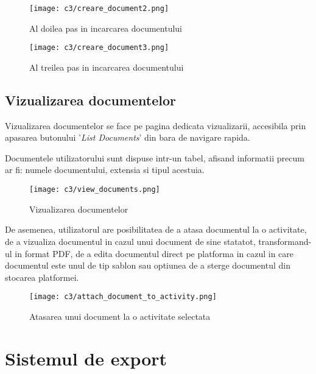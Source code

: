 \vspace{1cm}
\begin{figure}[h]
	\centering
	
	\texttt{[image: c3/creare\_document2.png]}
	\caption{Al doilea pas in incarcarea documentului}
\end{figure}


\vspace{1cm}
\begin{figure}[h]
	\centering
	
	\texttt{[image: c3/creare\_document3.png]}
	\caption{Al treilea pas in incarcarea documentului}
\end{figure}

\subsection*{Vizualizarea documentelor}

Vizualizarea documentelor se face pe pagina dedicata vizualizarii, accesibila prin apasarea butonului
'\textit{List Documents}' din bara de navigare rapida.

Documentele utilizatorului sunt dispuse intr-un tabel, afisand informatii precum ar fi: numele documentului, extensia si tipul acestuia.


\vspace{1cm}
\begin{figure}[h]
	\centering
	
	\texttt{[image: c3/view\_documents.png]}
	\caption{Vizualizarea documentelor }
\end{figure}


De asemenea, utilizatorul are posibilitatea de a atasa documentul la o activitate, de a vizualiza documentul in cazul unui document de sine statatot, transformand-ul in format PDF, de a edita documentul direct pe platforma in cazul in care documentul este unul de tip sablon sau optiunea de a sterge documentul din stocarea platformei.\\


\vspace{1cm}
\begin{figure}[h]
	\centering
	
	\texttt{[image: c3/attach\_document\_to\_activity.png]}
	\caption{Atasarea unui document la o activitate selectata}
\end{figure}



\section{Sistemul de export}

